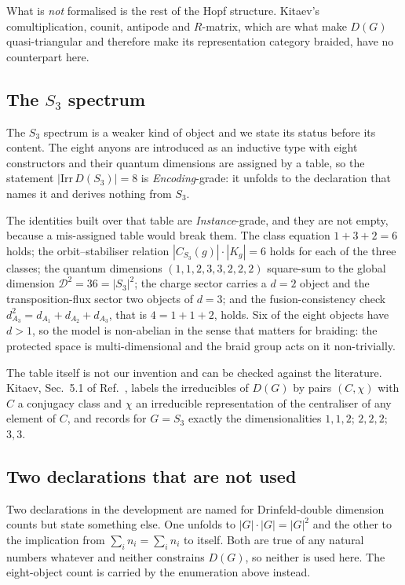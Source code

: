 \documentclass[aps,prx,nofootinbib,superscriptaddress,12pt]{revtex4-2}
\begin{document}
What is \emph{not} formalised is the rest of the Hopf structure.
Kitaev's comultiplication, counit, antipode and $R$-matrix, which are
what make $D(G)$ quasi-triangular and therefore make its representation
category braided, have no counterpart here.

\subsection{The $S_3$ spectrum}

The $S_3$ spectrum is a weaker kind of object and we state its status
before its content. The eight anyons are introduced as an inductive type
with eight constructors and their quantum dimensions are assigned by a
table, so the statement $|\mathrm{Irr}\,D(S_3)| = 8$ is
\emph{Encoding}-grade: it unfolds to the declaration that names it and
derives nothing from $S_3$.

The identities built over that table are \emph{Instance}-grade, and they
are not empty, because a mis-assigned table would break them. The class
equation $1 + 3 + 2 = 6$ holds; the orbit--stabiliser relation
$|C_{S_3}(g)|\cdot|K_g| = 6$ holds for each of the three classes; the
quantum dimensions $(1,1,2,3,3,2,2,2)$ square-sum to the global
dimension $\mathcal{D}^2 = 36 = |S_3|^2$; the charge sector carries a
$d = 2$ object and the transposition-flux sector two objects of $d = 3$;
and the fusion-consistency check
$d_{A_3}^2 = d_{A_1} + d_{A_2} + d_{A_3}$, that is $4 = 1+1+2$, holds.
Six of the eight objects have $d > 1$, so the model is non-abelian in
the sense that matters for braiding: the protected space is
multi-dimensional and the braid group acts on it non-trivially.

The table itself is not our invention and can be checked against the
literature. Kitaev, Sec.~5.1 of Ref.~\cite{KitaevAnyons2003}, labels the
irreducibles of $D(G)$ by pairs $(C,\chi)$ with $C$ a conjugacy class
and $\chi$ an irreducible representation of the centraliser of any
element of $C$, and records for $G = S_3$ exactly the dimensionalities
$1,1,2$; $2,2,2$; $3,3$.

\subsection{Two declarations that are not used}

Two declarations in the development are named for Drinfeld-double
dimension counts but state something else. One unfolds to
$|G| \cdot |G| = |G|^2$ and the other to the implication from
$\sum_i n_i = \sum_i n_i$ to itself. Both are true of any natural
numbers whatever and neither constrains $D(G)$, so neither is used here.
The eight-object count is carried by the enumeration above instead.
\end{document}
